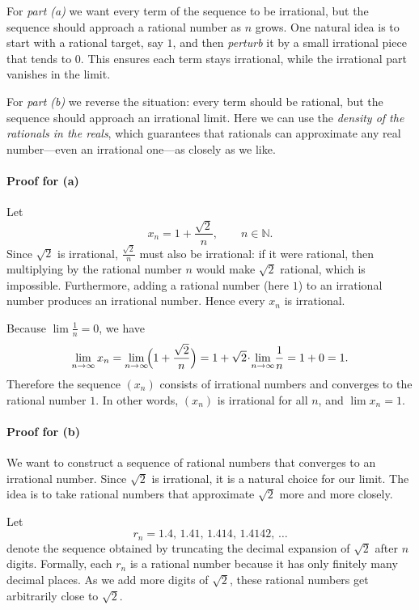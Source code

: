 \documentclass[12pt]{article}
\begin{document}
    For \textit{part (a)} we want every term of the sequence to be irrational, but the sequence should approach a rational number as $n$ grows.  One natural idea is to start with a rational target, say $1$, and then \emph{perturb} it by a small irrational piece that tends to $0$.  This ensures each term stays irrational, while the irrational part vanishes in the limit.
    
    For \textit{part (b)} we reverse the situation: every term should be rational, but the sequence should approach an irrational limit.  Here we can use the \emph{density of the rationals in the reals}, which guarantees that rationals can approximate any real number---even an irrational one---as closely as we like.


\paragraph{Proof for (a)}
Let
\[
x_n = 1 + \frac{\sqrt{2}}{n}, \qquad n\in\mathbb{N}.
\]
Since $\sqrt{2}$ is irrational, $\tfrac{\sqrt{2}}{n}$ must also be irrational: if it were rational, then multiplying by the rational number $n$ would make $\sqrt{2}$ rational, which is impossible.  Furthermore, adding a rational number (here $1$) to an irrational number produces an irrational number.  Hence every $x_n$ is irrational.

Because $\lim\tfrac{1}{n}=0$, we have
\[
\lim_{n\to\infty}x_n
  = \lim_{n\to\infty}\!\Bigl(1+\frac{\sqrt{2}}{n}\Bigr)
  = 1 + \sqrt{2}\!\cdot\!\lim_{n\to\infty}\!\frac{1}{n}
  = 1+0=1.
\]
Therefore the sequence $(x_n)$ consists of irrational numbers and converges to the rational number $1$. In other words, $(x_n)$ is irrational for all $n$, and $\displaystyle\lim x_n=1$.

\paragraph{Proof for (b)}
We want to construct a sequence of rational numbers that converges to an irrational number.  
Since $\sqrt{2}$ is irrational, it is a natural choice for our limit.  
The idea is to take rational numbers that approximate $\sqrt{2}$ more and more closely.

\smallskip
Let
\[
r_n = 1.4,\, 1.41,\, 1.414,\, 1.4142,\, \dots
\]
denote the sequence obtained by truncating the decimal expansion of $\sqrt{2}$ after $n$ digits.  
Formally, each $r_n$ is a rational number because it has only finitely many decimal places.  
As we add more digits of $\sqrt{2}$, these rational numbers get arbitrarily close to $\sqrt{2}$.
\end{document}
